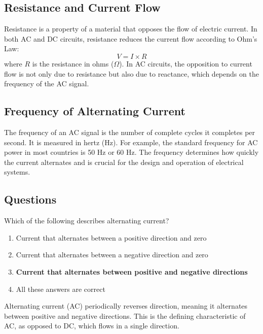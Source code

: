 \subsection*{Resistance and Current Flow}
Resistance is a property of a material that opposes the flow of electric current. In both AC and DC circuits, resistance reduces the current flow according to Ohm's Law:
\begin{equation}
    V = I \times R
\end{equation}
where \( R \) is the resistance in ohms (\(\Omega\)). In AC circuits, the opposition to current flow is not only due to resistance but also due to reactance, which depends on the frequency of the AC signal.

\subsection*{Frequency of Alternating Current}
The frequency of an AC signal is the number of complete cycles it completes per second. It is measured in hertz (Hz). For example, the standard frequency for AC power in most countries is 50 Hz or 60 Hz. The frequency determines how quickly the current alternates and is crucial for the design and operation of electrical systems.

\subsection*{Questions}
\begin{tcolorbox}[colback=gray!10!white,colframe=black!75!black,title={T5A09}]
    Which of the following describes alternating current?
    \begin{enumerate}[label=\Alph*),noitemsep]
        \item Current that alternates between a positive direction and zero
        \item Current that alternates between a negative direction and zero
        \item \textbf{Current that alternates between positive and negative directions}
        \item All these answers are correct
    \end{enumerate}
\end{tcolorbox}
Alternating current (AC) periodically reverses direction, meaning it alternates between positive and negative directions. This is the defining characteristic of AC, as opposed to DC, which flows in a single direction.


